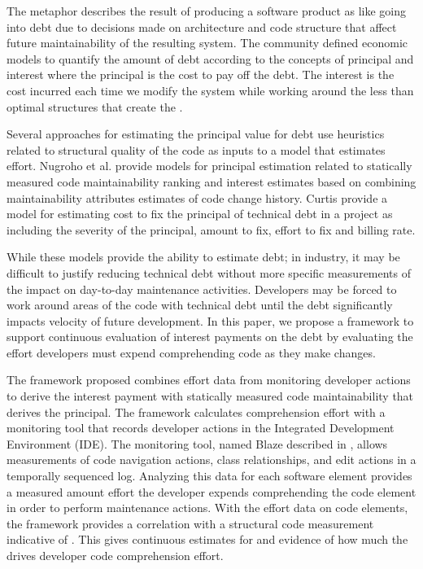 The \TD metaphor describes the result of producing a software product as like going into debt due to decisions made on architecture and code structure that affect future maintainability of the resulting system\cite{cunningham1992wycash}.  The \TD community defined economic models to quantify the amount of debt according to the concepts of principal and interest where the principal is the cost to pay off the debt.  The interest is the cost incurred each time we modify the system while working around the less than optimal structures that create the \TD.  

Several approaches for estimating the principal value for debt use heuristics related to structural quality of the code as inputs to a model that estimates effort.  Nugroho et al. provide models for principal estimation related to statically measured code maintainability ranking and interest estimates based on combining maintainability attributes estimates of code change history\cite{Nugroho2011Empirical}.  Curtis \etal provide a model for estimating cost to fix the principal of technical debt in a project as including the severity of the principal, amount to fix, effort to fix and billing rate\cite{Curtis2012Estimating}.  

While these models provide the ability to estimate debt; in industry, it may be difficult to justify reducing technical debt without more specific measurements of the impact on day-to-day maintenance activities.  Developers may be forced to work around areas of the code with technical debt until the debt significantly impacts velocity of future development.  In this paper, we propose a framework to support continuous evaluation of interest payments on the debt by evaluating the effort developers must expend comprehending code as they make changes. 

The framework proposed combines effort data from monitoring developer actions to derive the interest payment with statically measured code maintainability that derives the principal.   The framework calculates comprehension effort with a monitoring tool that records developer actions in the Integrated Development Environment (IDE).  The monitoring tool, named Blaze described in \cite{Snipes2014Experiences}, allows measurements of code navigation actions, class relationships, and edit actions in a temporally sequenced log.  Analyzing this data for each software element provides a measured amount effort the developer expends comprehending the code element in order to perform maintenance actions. With the effort data on code elements, the framework provides a correlation with a structural code measurement indicative of \TD.  This gives continuous estimates for and evidence of how much the \TD drives developer code comprehension effort.




